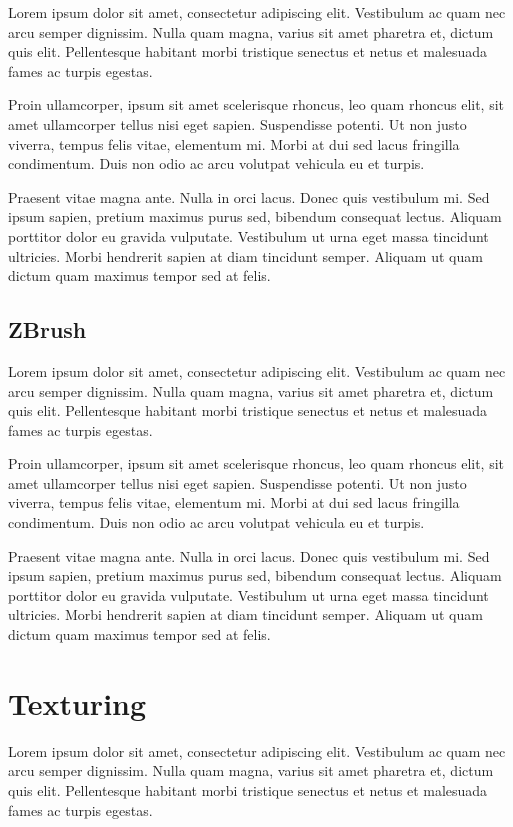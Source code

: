 \documentclass[12pt,a4paper]{report}
\begin{document}
Lorem ipsum dolor sit amet, consectetur adipiscing elit. Vestibulum ac quam nec arcu semper dignissim. Nulla quam magna, varius sit amet pharetra et, dictum quis elit. Pellentesque habitant morbi tristique senectus et netus et malesuada fames ac turpis egestas.

Proin ullamcorper, ipsum sit amet scelerisque rhoncus, leo quam rhoncus elit, sit amet ullamcorper tellus nisi eget sapien. Suspendisse potenti. Ut non justo viverra, tempus felis vitae, elementum mi. Morbi at dui sed lacus fringilla condimentum. Duis non odio ac arcu volutpat vehicula eu et turpis.

Praesent vitae magna ante. Nulla in orci lacus. Donec quis vestibulum mi. Sed ipsum sapien, pretium maximus purus sed, bibendum consequat lectus. Aliquam porttitor dolor eu gravida vulputate. Vestibulum ut urna eget massa tincidunt ultricies. Morbi hendrerit sapien at diam tincidunt semper. Aliquam ut quam dictum quam maximus tempor sed at felis.

\subsection{ZBrush}

Lorem ipsum dolor sit amet, consectetur adipiscing elit. Vestibulum ac quam nec arcu semper dignissim. Nulla quam magna, varius sit amet pharetra et, dictum quis elit. Pellentesque habitant morbi tristique senectus et netus et malesuada fames ac turpis egestas.

Proin ullamcorper, ipsum sit amet scelerisque rhoncus, leo quam rhoncus elit, sit amet ullamcorper tellus nisi eget sapien. Suspendisse potenti. Ut non justo viverra, tempus felis vitae, elementum mi. Morbi at dui sed lacus fringilla condimentum. Duis non odio ac arcu volutpat vehicula eu et turpis.

Praesent vitae magna ante. Nulla in orci lacus. Donec quis vestibulum mi. Sed ipsum sapien, pretium maximus purus sed, bibendum consequat lectus. Aliquam porttitor dolor eu gravida vulputate. Vestibulum ut urna eget massa tincidunt ultricies. Morbi hendrerit sapien at diam tincidunt semper. Aliquam ut quam dictum quam maximus tempor sed at felis.

\section{Texturing}

Lorem ipsum dolor sit amet, consectetur adipiscing elit. Vestibulum ac quam nec arcu semper dignissim. Nulla quam magna, varius sit amet pharetra et, dictum quis elit. Pellentesque habitant morbi tristique senectus et netus et malesuada fames ac turpis egestas.
\end{document}
